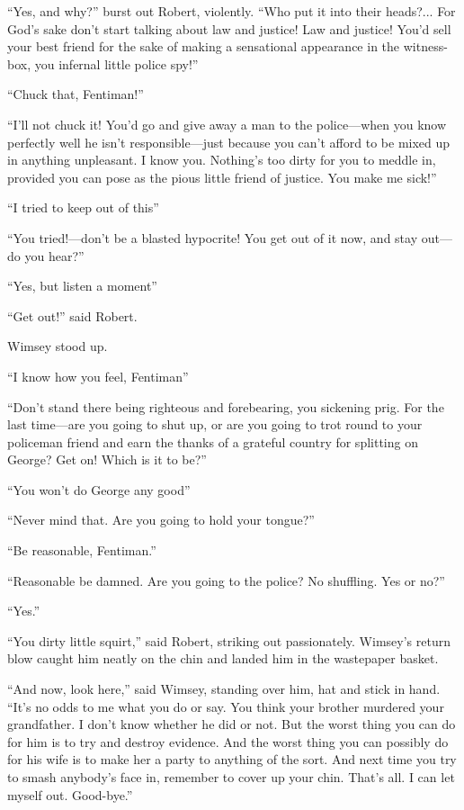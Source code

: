 \enquote{Yes, and why?} burst out Robert, violently. \enquote{Who put it into their heads?... For God's sake don't start talking about law and justice! Law and justice! You'd sell your best friend for the sake of making a sensational appearance in the witness-box, you infernal little police spy!}

\enquote{Chuck that, Fentiman!}

\enquote{I'll not chuck it! You'd go and give away a man to the police\allowbreak---\allowbreak when you know perfectly well he isn't responsible\allowbreak---\allowbreak just because you can't afford to be mixed up in anything unpleasant. I know you. Nothing's too dirty for you to meddle in, provided you can pose as the pious little friend of justice. You make me sick!}

\enquote{I tried to keep out of this\longdash}

\enquote{You tried!---don't be a blasted hypocrite! You get out of it now, and stay out\allowbreak---\allowbreak do you hear?}

\enquote{Yes, but listen a moment\longdash}

\enquote{Get out!} said Robert.

Wimsey stood up.

\enquote{I know how you feel, Fentiman\longdash}

\enquote{Don't stand there being righteous and forebearing, you sickening prig. For the last time\allowbreak---\allowbreak are you going to shut up, or are you going to trot round to your policeman friend and earn the thanks of a grateful country for splitting on George? Get on! Which is it to be?}

\enquote{You won't do George any good\longdash}

\enquote{Never mind that. Are you going to hold your tongue?}

\enquote{Be reasonable, Fentiman.}

\enquote{Reasonable be damned. Are you going to the police? No shuffling. Yes or no?}

\enquote{Yes.}

\enquote{You dirty little squirt,} said Robert, striking out passionately. Wimsey's return blow caught him neatly on the chin and landed him in the wastepaper basket.

\enquote{And now, look here,} said Wimsey, standing over him, hat and stick in hand. \enquote{It's no odds to me what you do or say. You think your brother murdered your grandfather. I don't know whether he did or not. But the worst thing you can do for him is to try and destroy evidence. And the worst thing you can possibly do for his wife is to make her a party to anything of the sort. And next time you try to smash anybody's face in, remember to cover up your chin. That's all. I can let myself out. Good-bye.}

